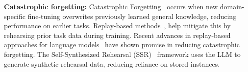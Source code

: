 \noindent\textbf{Catastrophic forgetting:}
Catastrophic Forgetting~\citep{french1999catastrophic, zheng-etal-2024-learn} occurs when new domain-specific fine-tuning overwrites previously learned general knowledge, reducing performance on earlier tasks. Replay-based methods~\citep{de2019episodic,rolnick2019experience}, help mitigate this by rehearsing prior task data during training. Recent advances in replay-based approaches for language models~\citep{scialom2022fine, mok2023large} have shown promise in reducing catastrophic forgetting. The Self-Synthesized Rehearsal (SSR)~\cite{gupta2024selective, huang2024mitigating} framework uses the LLM to generate synthetic rehearsal data, reducing reliance on stored instances.